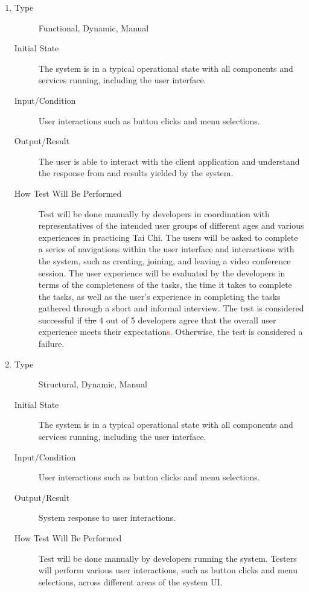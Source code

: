 \documentclass[12pt, titlepage]{article}
\newcommand{\rt}[1]{\textcolor{red}{#1}}
\begin{document}
\begin{enumerate}[NFR-T1]
\item \label{NFRT1}
  \begin{description}
  \item[Type] Functional, Dynamic, Manual
  \item[Initial State] The system is in a typical operational state with all
    components and services running, including the user interface.
  \item[Input/Condition] User interactions such as button clicks and menu
    selections.
  \item[Output/Result] The user is able to interact with the client application and
    understand the response from and results yielded by the system.
  \item[How Test Will Be Performed] Test will be done manually by developers in
    coordination with representatives of the intended user groups of different
    ages and various experiences in practicing Tai Chi. The users will be asked
    to complete a series of navigations within the user interface and
    interactions with the system, such as creating, joining, and leaving a video
    conference session. The user experience will be evaluated by the developers
    in terms of the completeness of the tasks, the time it takes to complete the
    tasks, as well as the user’s experience in completing the tasks gathered
    through a short and informal interview. The test is considered successful if
    \sout{the} 4 out of 5 developers agree that the overall user experience meets their
    expectation\rt{s}. Otherwise, the test is considered a failure.
  \end{description}
\item \label{NFRT2}
  \begin{description}
  \item[Type] Structural, Dynamic, Manual
  \item[Initial State] The system is in a typical operational state with all
    components and services running, including the user interface.
  \item[Input/Condition] User interactions such as button clicks and menu
    selections.
  \item[Output/Result] System response to user interactions.
  \item[How Test Will Be Performed] Test will be done manually by developers
    running the system. Testers will perform various user interactions, such as
    button clicks and menu selections, across different areas of the system UI.

\end{description}
\end{enumerate}
\end{document}
